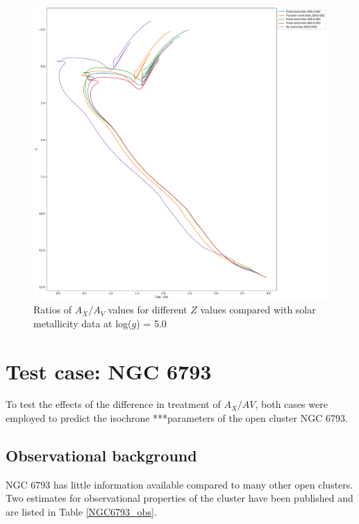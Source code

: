 \documentclass[12pt, a4paper]{report}
\begin{document}
\begin{figure}[h]
\begin{center}
\includegraphics[scale=0.3]{../basti_isochrones_10_13Gyr/Extinction_T50k_FeH0fix_func_G_GbpmGrp_500_400_600_Myr_FeH_0p002_ref_noext_Av_1p0.pdf}
\caption{Ratios of $A_{X}/A_{V}$ values for different $Z$ values compared with solar metallicity data at log($g$) = 5.0}
\label{gaia_isoc_T50k}
\end{center}
\end{figure}

\section{Test case: NGC 6793}
To test the effects of the difference in treatment of $A_{X}/A{V}$, both cases were employed to predict the isochrone ***parameters of the open cluster NGC 6793.

\subsection{Observational background}
NGC 6793 has little information available compared to many other open clusters. Two estimates for observational properties of the cluster have been published and are listed in Table \ref{NGC6793_obs}.
\end{document}
